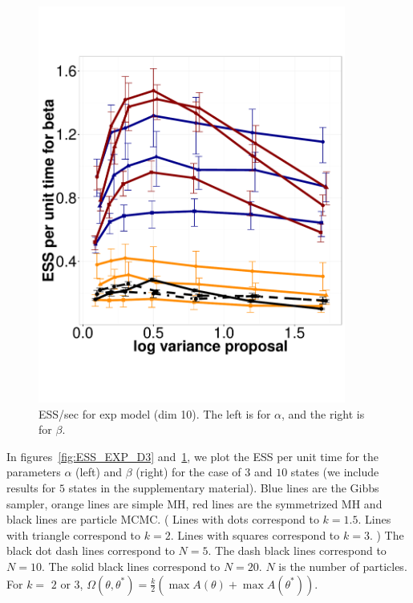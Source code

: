 \begin{figure}
\begin{minipage}[hp]{0.45\linewidth}
    \includegraphics [width=0.90\textwidth, angle=0]{figs/exp_10_beta.pdf}
    \vspace{-0 in}
  \end{minipage}
    \caption{ESS/sec for exp model (dim 10). The left is for $\alpha$, and the right is for $\beta$.}
     \label{fig:ESS_EXP_D10}
  \end{figure}
  In figures~\ref{fig:ESS_EXP_D3} and~\ref{fig:ESS_EXP_D10}, we plot the ESS 
  per unit time for the parameters $\alpha$ (left) and $\beta$ (right) for the
  case of $3$ and $10$ states (we include results for $5$ states in the 
  supplementary material). %
  Blue lines are the Gibbs sampler, orange lines are simple MH, red lines 
are the symmetrized MH and black lines are particle MCMC. 
(
{\color{red} Lines with dots correspond to $k = 1.5$. 
Lines with triangle correspond to $k = 2$. 
Lines with squares correspond to $k = 3$.  )
The black dot dash lines correspond to $N  = 5$. 
The dash black lines correspond to $N  = 10$. 
The solid black lines correspond to $N  = 20$. $N$ is the number of particles. 
For $k=$ $2$ or $3$, $\Omega(\theta, \theta^*) = 
\frac{k}{2} (\max A(\theta) + \max A(\theta^*))$. }
